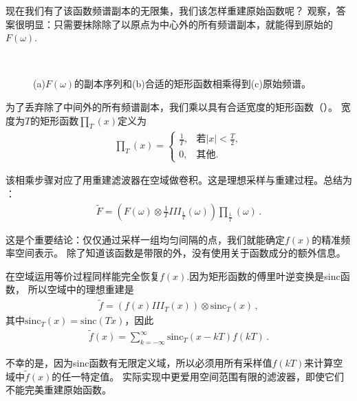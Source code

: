 现在我们有了该函数频谱副本的无限集，我们该怎样重建原始函数呢？
观察，答案很明显：只需要抹除除了以原点为中心外的所有频谱副本，就能得到原始的$F(\omega)$.
\begin{figure}[htbp]
    \centering
    \,
    \,
    \caption{(a)$F(\omega)$的副本序列和(b)合适的矩形函数相乘得到(c)原始频谱。}
    \label{fig:7.7}
\end{figure}

为了丢弃除了中间外的所有频谱副本，我们乘以具有合适宽度的矩形函数（）。
宽度为$T$的矩形函数$\textstyle\prod_T(x)$定义为
\begin{align*}
    {\textstyle\prod_T}(x)=\left\{\begin{array}{ll}
        \displaystyle\frac{1}{T}, & \text{若}\displaystyle|x|<\frac{T}{2}, \\
        0,                        & \text{其他}.
    \end{array}\right.
\end{align*}

该相乘步骤对应了用重建滤波器在空域做卷积。这是理想采样与重建过程。总结为
：
\begin{align*}
    \tilde{F}=(F(\omega)\otimes \frac{1}{T}III_{\frac{1}{T}}(\omega))\textstyle\prod_{\frac{1}{T}}(\omega)\, .
\end{align*}

这是个重要结论：仅仅通过采样一组均匀间隔的点，我们就能确定$f(x)$的精准频率空间表示。
除了知道该函数是带限的外，没有使用关于函数成分的额外信息。

在空域运用等价过程同样能完全恢复$f(x)$.因为矩形函数的傅里叶逆变换是sinc函数，
所以空域中的理想重建是
\begin{align*}
    \tilde{f}=(f(x)III_T(x))\otimes \mathrm{sinc}_T(x)\, ,
\end{align*}
其中$\mathrm{sinc}_T(x)=\mathrm{sinc}(Tx)$，因此
\begin{align*}
    \tilde{f}(x)=\sum\limits_{k=-\infty}^{\infty}\mathrm{sinc}_T(x-kT)f(kT)\, .
\end{align*}

不幸的是，因为sinc函数有无限定义域，所以必须用所有采样值$f(kT)$来计算空域中$\tilde{f}(x)$的任一特定值。
实际实现中更爱用空间范围有限的滤波器，即使它们不能完美重建原始函数。

